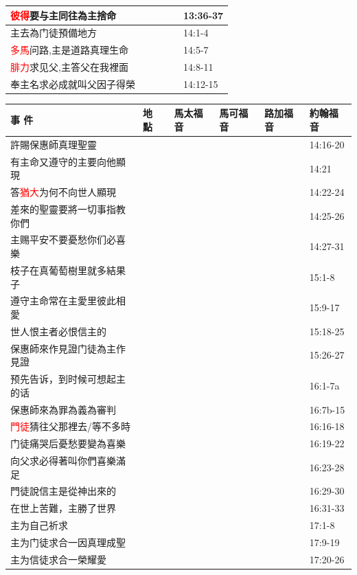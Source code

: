 \begin{table}[H]
\begin{tabular}{p{14em}|p{7.93em}|l|l|l|p{4.855em}}
\textcolor{red}{彼得}要与主同往為主捨命&& &&&13:36-37\\\midrule
主去為门徒預備地方&& &&&14:1-4\\\midrule
\textcolor{red}{多馬}问路,主是道路真理生命&& &&&14:5-7\\\midrule
\textcolor{red}{腓力}求见父,主答父在我裡面&& &&&14:8-11\\\midrule
奉主名求必成就叫父因子得榮&& &&&14:12-15\\\midrule
\end{tabular}%
\end{table}


\begin{table}[H]
  \centering
    \begin{tabular}{p{14em}|p{7.93em}|l|l|l|p{4.855em}}
    \toprule
    \textbf{事 件} & \textbf{地 點} & \multicolumn{1}{p{5.285em}|}{\textbf{馬太福音}} & \multicolumn{1}{p{5.57em}|}{\textbf{馬可福音}} & \multicolumn{1}{p{5.285em}|}{\textbf{路加福音}} & \textbf{約翰福音} \\  \midrule

許賜保惠師真理聖靈&& &&&14:16-20\\\midrule
有主命又遵守的主要向他顯現&& &&&14:21\\\midrule
答\textcolor{red}{猶大}为何不向世人顯現&& &&&14:22-24\\\midrule
差來的聖靈要將一切事指教你們&& &&&14:25-26\\\midrule
主赐平安不要憂愁你们必喜樂&& &&&14:27-31\\\midrule
枝子在真葡萄樹里就多結果子&& &&&15:1-8\\\midrule
遵守主命常在主愛里彼此相愛&& &&&15:9-17\\\midrule

世人恨主者必恨信主的&& &&&15:18-25\\\midrule
保惠師來作見證门徒為主作見證&& &&&15:26-27\\\midrule
预先告诉，到时候可想起主的话&& &&&16:1-7a\\\midrule
保惠師來為罪為義為審判&& &&&16:7b-15\\\midrule
\textcolor{red}{門徒}猜往父那裡去/等不多時&& &&&16:16-18\\\midrule
门徒痛哭后憂愁要變為喜樂&& &&&16:19-22\\\midrule
向父求必得著叫你們喜樂滿足&& &&&16:23-28\\\midrule
門徒說信主是從神出來的&& &&&16:29-30\\\midrule
在世上苦難，主勝了世界&& &&&16:31-33\\\midrule
主为自己祈求&& &&&17:1-8\\\midrule
主为门徒求合一因真理成聖&& &&&17:9-19\\\midrule
主为信徒求合一榮耀愛&& &&&17:20-26\\\midrule


\end{tabular}
\end{table}
